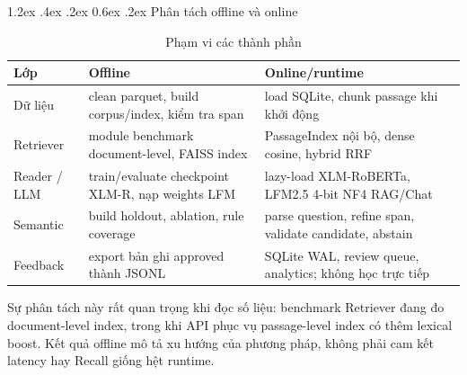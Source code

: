 \documentclass[12pt,a4paper,oneside]{report}
\makeatletter
\renewcommand\section{\@startsection {section}{1}{\z@}%
  {1.2ex \@plus .4ex \@minus .2ex}%
  {0.6ex \@plus .2ex}%
  {\normalfont\Large\bfseries}}
\makeatother
\begin{document}
\section{Phân tách offline và online}
\begin{table}[H]
\centering
\caption{Phạm vi các thành phần}
\label{tab:offline-online}
\begin{tabularx}{\textwidth}{L{3.0cm}YY}
\toprule
Lớp & Offline & Online/runtime \\
\midrule
Dữ liệu & clean parquet, build corpus/index, kiểm tra span & load SQLite, chunk passage khi khởi động \\
Retriever & module benchmark document-level, FAISS index & PassageIndex nội bộ, dense cosine, hybrid RRF \\
Reader / LLM & train/evaluate checkpoint XLM-R, nạp weights LFM & lazy-load XLM-RoBERTa, LFM2.5 4-bit NF4 RAG/Chat \\
Semantic & build holdout, ablation, rule coverage & parse question, refine span, validate candidate, abstain \\
Feedback & export bản ghi approved thành JSONL & SQLite WAL, review queue, analytics; không học trực tiếp \\
\bottomrule
\end{tabularx}
\end{table}

Sự phân tách này rất quan trọng khi đọc số liệu: benchmark Retriever đang đo
document-level index, trong khi API phục vụ passage-level index có thêm lexical boost.
Kết quả offline mô tả xu hướng của phương pháp, không phải cam kết latency hay Recall
giống hệt runtime.
\end{document}
